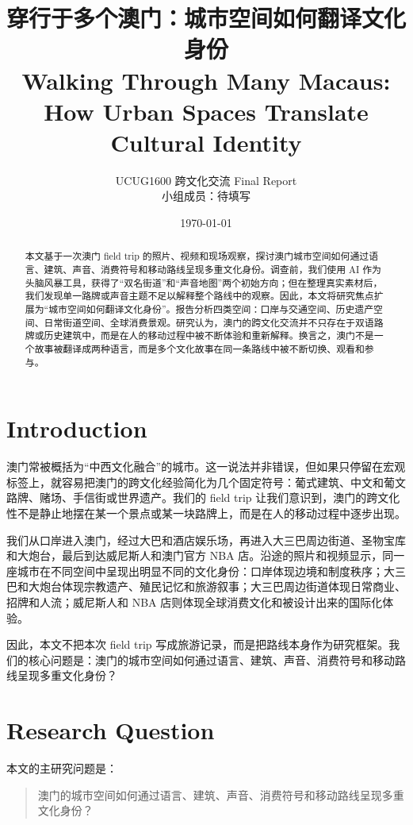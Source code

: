 \documentclass[12pt,a4paper]{article}
\title{穿行于多个澳门：城市空间如何翻译文化身份\\
\large Walking Through Many Macaus: How Urban Spaces Translate Cultural Identity}
\author{UCUG1600 跨文化交流 Final Report\\小组成员：待填写}
\date{\today}
\begin{document}
\maketitle

\begin{abstract}
本文基于一次澳门 field trip 的照片、视频和现场观察，探讨澳门城市空间如何通过语言、建筑、声音、消费符号和移动路线呈现多重文化身份。调查前，我们使用 AI 作为头脑风暴工具，获得了“双名街道”和“声音地图”两个初始方向；但在整理真实素材后，我们发现单一路牌或声音主题不足以解释整个路线中的观察。因此，本文将研究焦点扩展为“城市空间如何翻译文化身份”。报告分析四类空间：口岸与交通空间、历史遗产空间、日常街道空间、全球消费景观。研究认为，澳门的跨文化交流并不只存在于双语路牌或历史建筑中，而是在人的移动过程中被不断体验和重新解释。换言之，澳门不是一个故事被翻译成两种语言，而是多个文化故事在同一条路线中被不断切换、观看和参与。
\end{abstract}

\section{Introduction}

澳门常被概括为“中西文化融合”的城市。这一说法并非错误，但如果只停留在宏观标签上，就容易把澳门的跨文化经验简化为几个固定符号：葡式建筑、中文和葡文路牌、赌场、手信街或世界遗产。我们的 field trip 让我们意识到，澳门的跨文化性不是静止地摆在某一个景点或某一块路牌上，而是在人的移动过程中逐步出现。

我们从口岸进入澳门，经过大巴和酒店娱乐场，再进入大三巴周边街道、圣物宝库和大炮台，最后到达威尼斯人和澳门官方 NBA 店。沿途的照片和视频显示，同一座城市在不同空间中呈现出明显不同的文化身份：口岸体现边境和制度秩序；大三巴和大炮台体现宗教遗产、殖民记忆和旅游叙事；大三巴周边街道体现日常商业、招牌和人流；威尼斯人和 NBA 店则体现全球消费文化和被设计出来的国际化体验。

因此，本文不把本次 field trip 写成旅游记录，而是把路线本身作为研究框架。我们的核心问题是：澳门的城市空间如何通过语言、建筑、声音、消费符号和移动路线呈现多重文化身份？

\section{Research Question}

本文的主研究问题是：

\begin{quote}
澳门的城市空间如何通过语言、建筑、声音、消费符号和移动路线呈现多重文化身份？
\end{quote}
\end{document}
